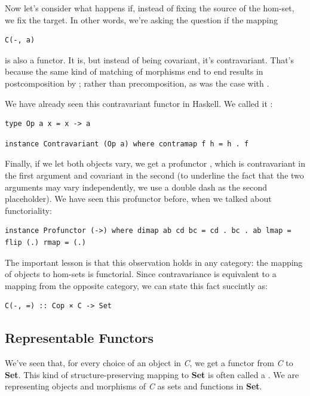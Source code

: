 Now let's consider what happens if, instead of fixing the source of the
hom-set, we fix the target. In other words, we're asking the question if
the mapping

\begin{verbatim}
C(-, a)
\end{verbatim}

is also a functor. It is, but instead of being covariant, it's
contravariant. That's because the same kind of matching of morphisms end
to end results in postcomposition by ; rather than
precomposition, as was the case with .

We have already seen this contravariant functor in Haskell. We called it
:

\begin{verbatim}
type Op a x = x -> a
\end{verbatim}

\begin{verbatim}
instance Contravariant (Op a) where contramap f h = h . f
\end{verbatim}

Finally, if we let both objects vary, we get a profunctor
, which is contravariant in the first argument and
covariant in the second (to underline the fact that the two arguments
may vary independently, we use a double dash as the second placeholder).
We have seen this profunctor before, when we talked about functoriality:

\begin{verbatim}
instance Profunctor (->) where dimap ab cd bc = cd . bc . ab lmap = flip (.) rmap = (.)
\end{verbatim}

The important lesson is that this observation holds in any category: the
mapping of objects to hom-sets is functorial. Since contravariance is
equivalent to a mapping from the opposite category, we can state this
fact succintly as:

\begin{verbatim}
C(-, =) :: Cop × C -> Set
\end{verbatim}

\subsection{Representable Functors}\label{representable-functors}

We've seen that, for every choice of an object  in \emph{C},
we get a functor from \emph{C} to \textbf{Set}. This kind of
structure-preserving mapping to \textbf{Set} is often called a
. We are representing objects and morphisms of
\emph{C} as sets and functions in \textbf{Set}.

